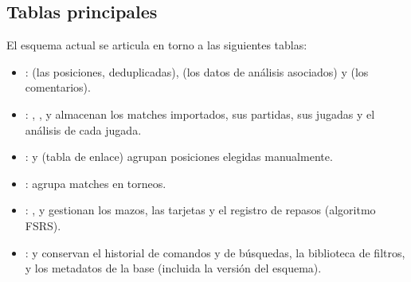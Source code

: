 \documentclass[letterpaper,10pt,spanish]{sphinxmanual}
\begin{document}
\subsection{Tablas principales}
\label{\detokenize{annexe_db_scheme:principales-tables}}
\sphinxAtStartPar
El esquema actual se articula en torno a las siguientes tablas:
\begin{itemize}
\item {} 
\sphinxAtStartPar
{}:  (las posiciones, deduplicadas),  (los datos de análisis asociados) y  (los comentarios).

\item {} 
\sphinxAtStartPar
{}: , ,  y  almacenan los matches importados, sus partidas, sus jugadas y el análisis de cada jugada.

\item {} 
\sphinxAtStartPar
{}:  y  (tabla de enlace) agrupan posiciones elegidas manualmente.

\item {} 
\sphinxAtStartPar
{}:  agrupa matches en torneos.

\item {} 
\sphinxAtStartPar
{}: ,  y  gestionan los mazos, las tarjetas y el registro de repasos (algoritmo FSRS).

\item {} 
\sphinxAtStartPar
{}:  y  conservan el historial de comandos y de búsquedas,  la biblioteca de filtros, y  los metadatos de la base (incluida la versión del esquema).

\end{itemize}
\end{document}
